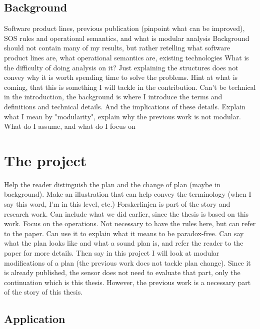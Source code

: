 \documentclass[a4paper,english]{ifimaster}
\begin{document}
\chapter{Background} 
Software product lines, previous publication (pinpoint what can be improved), SOS rules and operational semantics, and what is modular analysis
Background should not contain many of my results, but rather retelling what software product lines are, what operational semantics are, existing technologies
What is the difficulty of doing analysis on it? Just explaining the structures does not convey why it is worth spending time to solve the problems. Hint at what is coming, that this is something I will tackle in the contribution. 
Can't be technical in the introduction, the background is where I introduce the terms and definitions and technical details. And the implications of these details.
Explain what I mean by "modularity", explain why the previous work is not modular. 
What do I assume, and what do I focus on

\part{The project}

Help the reader distinguish the plan and the change of plan (maybe in background). Make an illustration that can help convey the terminology (when I say this word, I'm in this level, etc.)
Forskerlinjen is part of the story and research work. Can include what we did earlier, since the thesis is based on this work. Focus on the operations. Not necessary to have the rules here, but can refer to the paper. Can use it to explain what it means to be paradox-free. Can say what the plan looks like and what a sound plan is, and refer the reader to the paper for more details. Then say in this project I will look at modular modifications of a plan (the previous work does not tackle plan change). Since it is already published, the sensor does not need to evaluate that part, only the continuation which is this thesis. However, the previous work is a necessary part of the story of this thesis.





\chapter{Application}
\end{document}
